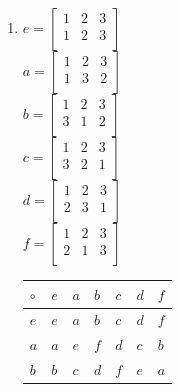 \begin{enumerate}
    \item \begin{minipage}{0.5\textwidth}
        \centering
        $e = \begin{bmatrix}
            1 & 2 & 3 \\
            1 & 2 & 3 \\
        \end{bmatrix}$\\
        $a = \begin{bmatrix}
            1 & 2 & 3 \\
            1 & 3 & 2 \\
        \end{bmatrix}$\\
        $b = \begin{bmatrix}
            1 & 2 & 3 \\
            3 & 1 & 2 \\
        \end{bmatrix}$\\
        $c = \begin{bmatrix}
            1 & 2 & 3 \\
            3 & 2 & 1 \\
        \end{bmatrix}$\\
        $d = \begin{bmatrix}
            1 & 2 & 3 \\
            2 & 3 & 1 \\
        \end{bmatrix}$\\
        $f = \begin{bmatrix}
            1 & 2 & 3 \\
            2 & 1 & 3 \\
        \end{bmatrix}$\\
    \end{minipage}
    \begin{minipage}{0.5\textwidth}
        \centering
        \begin{tabular}{l|llllll}
            $\circ$ & $e$ & $a$ & $b$ & $c$ & $d$ & $f$ \\ \hline
            $e$       & $e$ & $a$ & $b$ & $c$ & $d$ & $f$ \\
            $a$       & $a$ & $e$ & $f$ & $d$ & $c$ & $b$ \\
            $b$       & $b$ & $c$ & $d$ & $f$ & $e$ & $a$ \\

\end{tabular}
\end{minipage}
\end{enumerate}

